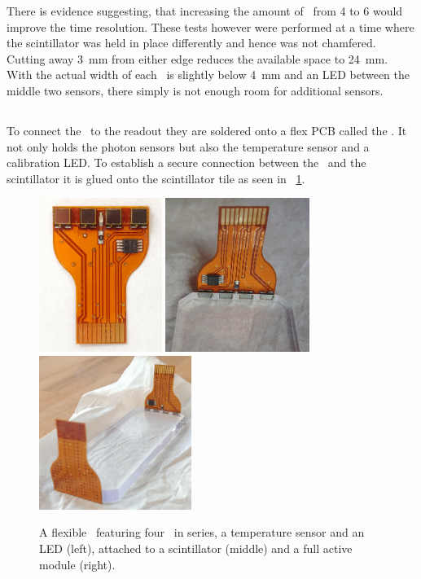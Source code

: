 \documentclass[../BTOF_summary.tex]{subfiles}
\begin{document}
There is evidence suggesting, that increasing the amount of \sipms\ from 4 to 6 would improve the time resolution.
These tests however were performed at a time where the scintillator was held in place differently and hence was not chamfered.
Cutting away \SI{3}{mm} from either edge reduces the available space to \SI{24}{mm}.
With the actual width of each \sipm\ is slightly below \SI{4}{mm} and an LED between the middle two sensors, there simply is not enough room for additional sensors.

\subsection{\sensorboard}

To connect the \sipms\ to the readout they are soldered onto a flex PCB called the \sensorboard .
It not only holds the photon sensors but also the temperature sensor and a calibration LED.
To establish a secure connection between the \sipms\ and the scintillator it is glued onto the scintillator tile as seen in \fig~\ref{fig:SensorBoradNew}.

\begin{figure}[htbp]
	\centering
	\includegraphics[height=5cm]{fig/SensorBoardNew2.png}
	\includegraphics[height=5cm]{fig/Sensorboards2Scintillator.jpg}
	\includegraphics[height=5cm]{fig/Sensorboards2Scintillator2.jpg}
	\caption[The flexible \sensorboard .]{A flexible \sensorboard\ featuring four \sipms\ in series, a temperature sensor and an LED (left), attached to a scintillator (middle) and a full active module (right).}
	\label{fig:SensorBoradNew}
\end{figure}
\end{document}
